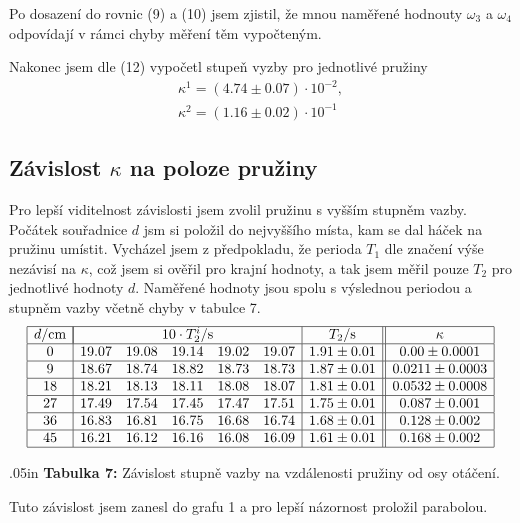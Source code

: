 \documentclass[a4paper,12pt]{article}
\begin{document}
Po dosazení do rovnic (9) a (10) jsem zjistil, že mnou naměřené hodnouty $\omega_3$ a $\omega_4$ odpovídají v rámci chyby měření těm vypočteným.

Nakonec jsem dle (12) vypočetl stupeň vyzby pro jednotlivé pružiny
\begin{eqnarray}
	\kappa^1=(4.74\pm0.07)\cdot 10^{-2}, \\
	\kappa^2=(1.16\pm0.02)\cdot 10^{-1}
\end{eqnarray}

\subsection{Závislost $\kappa$ na poloze pružiny}
\noindent
Pro lepší viditelnost závislosti jsem zvolil pružinu s vyšším stupněm vazby. Počátek souřadnice $d$ jsm si položil do nejvyššího místa, kam se dal háček na pružinu umístit. Vycházel jsem z předpokladu, že perioda $T_1$ dle značení výše nezávisí na $\kappa$, což jsem si ověřil pro krajní hodnoty, a tak jsem měřil pouze $T_2$ pro jednotlivé hodnoty $d$. Naměřené hodnoty jsou spolu s výslednou periodou a stupněm vazby včetně chyby v tabulce 7.
$$
\begin{array}{|c|ccccc|c||c|}
\hline
	d/\mbox{cm}&	\multicolumn{5}{|c|}{10\cdot T^i_2/\mbox{s}} & T_2/\mbox{s}& \kappa \\ \hline
	0&19.07&19.08&19.14&19.02&19.07&1.91\pm 0.01&	0.00\pm 0.0001 \\ \hline
	9&	18.67&	18.74&	18.82&	18.73&	18.73&1.87\pm 0.01&	0.0211\pm0.0003\\ \hline
	18&	18.21&	18.13&	18.11&	18.08&	18.07&1.81\pm 0.01&	0.0532\pm0.0008\\ \hline
	27&	17.49&	17.54&	17.45&	17.47&	17.51&1.75\pm 0.01&	0.087\pm0.001\\ \hline
	36&	16.83&	16.81&	16.75&	16.68&	16.74&1.68\pm 0.01&	0.128\pm0.002\\ \hline
	45&	16.21&	16.12&	16.16&	16.08&	16.09&1.61\pm 0.01&	0.168\pm0.002\\ \hline
\end{array}
$$
\begin{center}
	\vglue.05in
	\textbf{Tabulka 7:} Závislost stupně vazby na vzdálenosti pružiny od osy otáčení.
\end{center}	
Tuto závislost jsem zanesl do grafu 1 a pro lepší názornost proložil parabolou.
\end{document}
